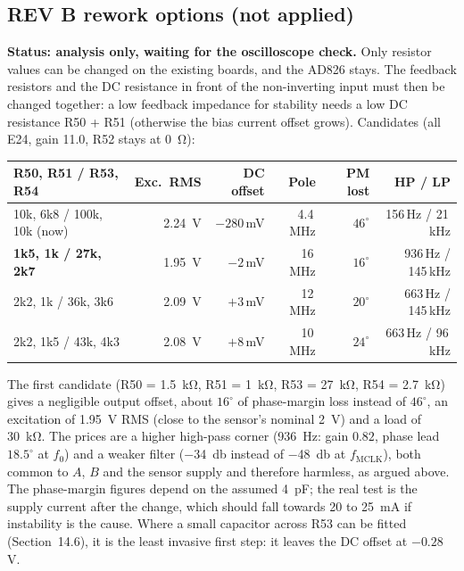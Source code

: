 \documentclass[11pt,a4paper]{article}
\begin{document}
\subsection{REV B rework options (not applied)}

\textbf{Status: analysis only, waiting for the oscilloscope check.}  Only resistor values can be
changed on the existing boards, and the AD826 stays.  The feedback resistors and the DC
resistance in front of the non-inverting input must then be changed together: a low feedback
impedance for stability needs a low DC resistance R50 + R51 (otherwise the bias current
offset grows).  Candidates (all E24, gain 11.0, R52 stays at \SI{0}{\ohm}):
\begin{center}
\small
\begin{tabular}{@{}lrrrrr@{}}
\toprule
R50, R51 / R53, R54 & Exc.\ RMS & DC offset & Pole & PM lost & HP / LP \\
\midrule
10k, 6k8 / 100k, 10k (now) & \SI{2.24}{\volt} & $-280$\,mV & 4.4\,MHz & $46^{\circ}$ & 156\,Hz / 21\,kHz \\
\textbf{1k5, 1k / 27k, 2k7} & \SI{1.95}{\volt} & $-2$\,mV & 16\,MHz & $16^{\circ}$ & 936\,Hz / 145\,kHz \\
2k2, 1k / 36k, 3k6         & \SI{2.09}{\volt} & $+3$\,mV & 12\,MHz & $20^{\circ}$ & 663\,Hz / 145\,kHz \\
2k2, 1k5 / 43k, 4k3        & \SI{2.08}{\volt} & $+8$\,mV & 10\,MHz & $24^{\circ}$ & 663\,Hz / 96\,kHz \\
\bottomrule
\end{tabular}
\end{center}
The first candidate (R50 = \SI{1.5}{\kilo\ohm}, R51 = \SI{1}{\kilo\ohm}, R53 = \SI{27}{\kilo\ohm},
R54 = \SI{2.7}{\kilo\ohm}) gives a negligible output offset, about $16^{\circ}$ of phase-margin loss
instead of $46^{\circ}$, an excitation of \SI{1.95}{\volt} RMS (close to the sensor's nominal
\SI{2}{\volt}) and a load of \SI{30}{\kilo\ohm}.  The prices are a higher high-pass corner
(\SI{936}{\hertz}: gain $0.82$, phase lead $18.5^{\circ}$ at $f_0$) and a weaker filter
(\SI{-34}{\decibel} instead of \SI{-48}{\decibel} at $f_{\mathrm{MCLK}}$), both common to $A$,
$B$ and the sensor supply and therefore harmless, as argued above.  The phase-margin figures
depend on the assumed \SI{4}{\pico\farad}; the real test is the supply current after the change,
which should fall towards 20 to \SI{25}{\milli\ampere} if instability is the cause.  Where a
small capacitor across R53 can be fitted (Section~14.6), it is the least invasive first step: it
leaves the DC offset at $-0.28$\,V.
\end{document}
